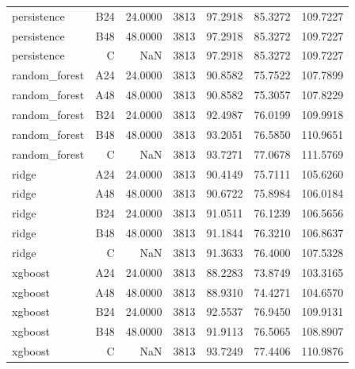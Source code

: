\begin{table}[htbp]
\begin{tabular}{lrrrrrr}
persistence & B24 & 24.0000 & 3813 & 97.2918 & 85.3272 & 109.7227 \\
persistence & B48 & 48.0000 & 3813 & 97.2918 & 85.3272 & 109.7227 \\
persistence & C & NaN & 3813 & 97.2918 & 85.3272 & 109.7227 \\
random\_forest & A24 & 24.0000 & 3813 & 90.8582 & 75.7522 & 107.7899 \\
random\_forest & A48 & 48.0000 & 3813 & 90.8582 & 75.3057 & 107.8229 \\
random\_forest & B24 & 24.0000 & 3813 & 92.4987 & 76.0199 & 109.9918 \\
random\_forest & B48 & 48.0000 & 3813 & 93.2051 & 76.5850 & 110.9651 \\
random\_forest & C & NaN & 3813 & 93.7271 & 77.0678 & 111.5769 \\
ridge & A24 & 24.0000 & 3813 & 90.4149 & 75.7111 & 105.6260 \\
ridge & A48 & 48.0000 & 3813 & 90.6722 & 75.8984 & 106.0184 \\
ridge & B24 & 24.0000 & 3813 & 91.0511 & 76.1239 & 106.5656 \\
ridge & B48 & 48.0000 & 3813 & 91.1844 & 76.3210 & 106.8637 \\
ridge & C & NaN & 3813 & 91.3633 & 76.4000 & 107.5328 \\
xgboost & A24 & 24.0000 & 3813 & 88.2283 & 73.8749 & 103.3165 \\
xgboost & A48 & 48.0000 & 3813 & 88.9310 & 74.4271 & 104.6570 \\
xgboost & B24 & 24.0000 & 3813 & 92.5537 & 76.9450 & 109.9131 \\
xgboost & B48 & 48.0000 & 3813 & 91.9113 & 76.5065 & 108.8907 \\
xgboost & C & NaN & 3813 & 93.7249 & 77.4406 & 110.9876 \\
\bottomrule
\end{tabular}
\end{table}
